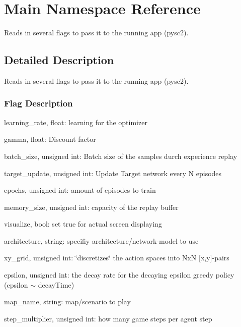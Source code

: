 \hypertarget{namespaceMain}{}\section{Main Namespace Reference}
\label{namespaceMain}


Reads in several flags to pass it to the running app (pysc2).  




\subsection{Detailed Description}
Reads in several flags to pass it to the running app (pysc2). 

\subsubsection*{Flag Description}


\begin{DoxyItemize}
\item learning\+\_\+rate, float\+: learning for the optimizer
\item gamma, float\+: Discount factor
\item batch\+\_\+size, unsigned int\+: Batch size of the samples durch experience replay
\item target\+\_\+update, unsigned int\+: Update Target network every N episodes
\item epochs, unsigned int\+: amount of episodes to train
\item memory\+\_\+size, unsigned int\+: capacity of the replay buffer
\item visualize, bool\+: set true for actual screen displaying
\item architecture, string\+: specifiy architecture/network-\/model to use
\item xy\+\_\+grid, unsigned int\+: \char`\"{}discretizes\char`\"{} the action spaces into NxN \mbox{[}x,y\mbox{]}-\/pairs
\item epsilon, unsigned int\+: the decay rate for the decaying epsilon greedy policy (epsilon $\sim$ decay\+Time)
\item map\+\_\+name, string\+: map/scenario to play
\item step\+\_\+multiplier, unsigned int\+: how many game steps per agent step 
\end{DoxyItemize}